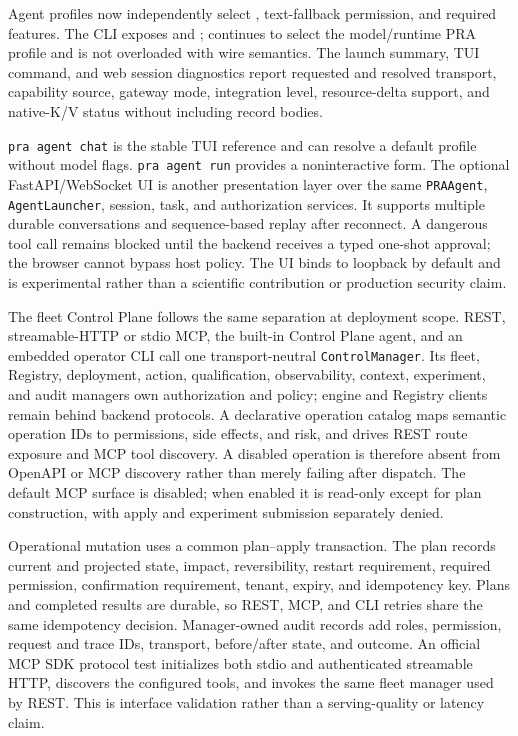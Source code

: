 \documentclass[11pt]{article}
\begin{document}
Agent profiles now independently select
, text-fallback permission, and required
features. The CLI exposes  and
;  continues to
select the model/runtime PRA profile and is not overloaded with wire semantics.
The launch summary, TUI  command, and web session diagnostics
report requested and resolved transport, capability source, gateway mode,
integration level, resource-delta support, and native-K/V status without
including record bodies.

\texttt{pra agent chat} is the stable TUI reference and can resolve a default
profile without model flags. \texttt{pra agent run} provides a noninteractive
form. The optional FastAPI/WebSocket UI is another presentation layer over the
same \texttt{PRAAgent}, \texttt{AgentLauncher}, session, task, and authorization
services. It supports multiple durable conversations and sequence-based replay
after reconnect. A dangerous tool call remains blocked until the backend
receives a typed one-shot approval; the browser cannot bypass host policy. The
UI binds to loopback by default and is experimental rather than a scientific
contribution or production security claim.

The fleet Control Plane follows the same separation at deployment scope. REST,
streamable-HTTP or stdio MCP, the built-in Control Plane agent, and an embedded
operator CLI call one transport-neutral \texttt{ControlManager}. Its fleet,
Registry, deployment, action, qualification, observability, context, experiment,
and audit managers own authorization and policy; engine and Registry clients
remain behind backend protocols. A declarative operation catalog maps semantic
operation IDs to permissions, side effects, and risk, and drives REST route
exposure and MCP tool discovery. A disabled operation is therefore absent from
OpenAPI or MCP discovery rather than merely failing after dispatch. The default
MCP surface is disabled; when enabled it is read-only except for plan
construction, with apply and experiment submission separately denied.

Operational mutation uses a common plan--apply transaction. The plan records
current and projected state, impact, reversibility, restart requirement,
required permission, confirmation requirement, tenant, expiry, and idempotency
key. Plans and completed results are durable, so REST, MCP, and CLI retries share
the same idempotency decision. Manager-owned audit records add roles,
permission, request and trace IDs, transport, before/after state, and outcome.
An official MCP SDK protocol test initializes both stdio and authenticated
streamable HTTP, discovers the configured tools, and invokes the same fleet
manager used by REST. This is interface validation rather than a serving-quality
or latency claim.
\end{document}
